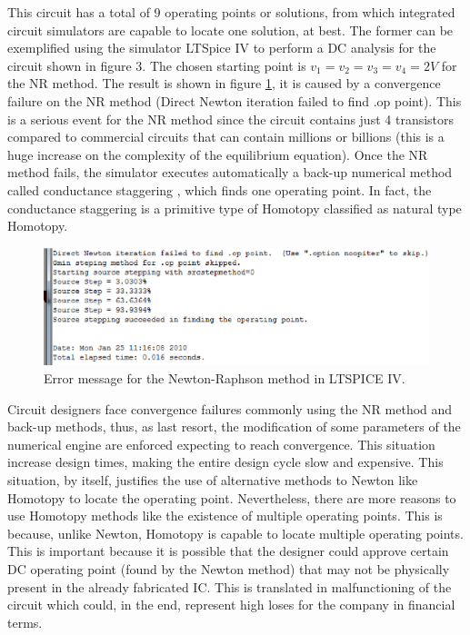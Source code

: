 \documentclass[conference,letterpaper,onecolumn]{IEEEtran}
\begin{document}
This circuit has a total of 9 operating points or solutions, from which integrated circuit simulators are capable to locate one solution, at best. The former can be exemplified using the simulator LTSpice IV \cite{LTSpice} to perform a DC analysis for the circuit shown in figure 3. The chosen starting point is $v_1=v_2=v_3=v_4=2V$ for the NR method. The result is shown in figure \ref{newtonfail}, it is caused by a convergence failure on the NR method ({\sf Direct Newton iteration failed to find .op point}). This is a serious event for the NR method since the circuit contains just 4 transistors compared to commercial circuits that can contain millions or billions (this is a huge increase on the complexity of the equilibrium equation). Once the NR method fails, the simulator executes automatically a back-up numerical method called conductance staggering \cite{homo_spectre,homo_hspice,homo_aplac}, which finds one operating point. In fact, the conductance staggering is a primitive type of Homotopy classified as natural type Homotopy.

\begin{figure}[tbp]
\centering
\includegraphics[width=15cm]{figs/newtonfail.eps}
\caption{Error message for the Newton-Raphson method in LTSPICE IV.}
\label{newtonfail}
\end{figure}

Circuit designers face convergence failures commonly using the NR method and back-up methods, thus, as last resort, the modification of some parameters of the numerical engine are enforced expecting to reach convergence. This situation increase design times, making the entire design cycle slow and expensive. This situation, by itself, justifies the use of alternative methods to Newton like Homotopy to locate the operating point. Nevertheless, there are more reasons to use Homotopy methods like the existence of multiple operating points. This is because, unlike Newton, Homotopy is capable to locate multiple operating points. This is important because it is possible that the designer could approve certain DC operating point (found by the Newton method) that may not be physically present in the already fabricated IC. This is translated in malfunctioning of the circuit which could, in the end, represent high loses for the company in financial terms.
\end{document}
